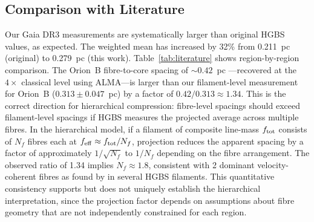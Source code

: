 \documentclass[twoside,twocolumn]{mnras}
\begin{document}
\subsection{Comparison with Literature}

Our Gaia DR3 measurements are systematically larger than original HGBS values, as
expected. The weighted mean has increased by 32\% from 0.211~pc (original) to
0.279~pc (this work). Table~\ref{tab:literature} shows region-by-region comparison.
The Orion~B fibre-to-core spacing of ${\sim}0.42$~pc \citep{Yang2024}---recovered at the
$4\times$ classical level using ALMA---is larger than our filament-level measurement for
Orion~B ($0.313 \pm 0.047$~pc) by a factor of $0.42/0.313 \approx 1.34$. This is the
correct direction for hierarchical compression: fibre-level spacings should exceed
filament-level spacings if HGBS measures the projected average across multiple fibres.
In the hierarchical model, if a filament of composite line-mass $f_{\rm tot}$ consists
of $N_f$ fibres each at $f_{\rm eff} \approx f_{\rm tot}/N_f$, projection reduces the
apparent spacing by a factor of approximately $1/\sqrt{N_f}$ to $1/N_f$ depending on
the fibre arrangement. The observed ratio of 1.34 implies $N_f \approx 1.8$, consistent
with 2 dominant velocity-coherent fibres as found by \citet{Hacar2018} in several HGBS
filaments. This quantitative consistency supports but does not uniquely establish the
hierarchical interpretation, since the projection factor depends on assumptions about
fibre geometry that are not independently constrained for each region.
\end{document}
